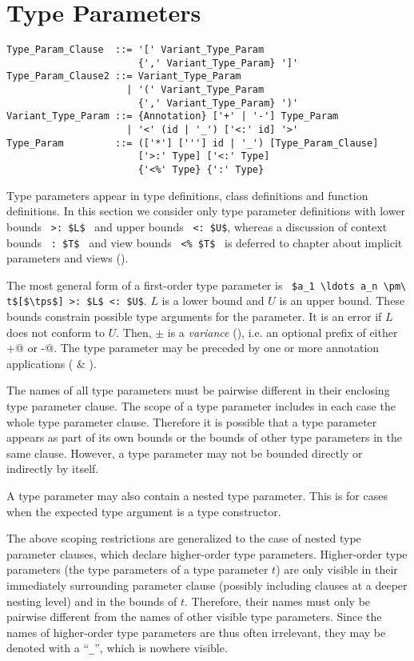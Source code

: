 \section{Type Parameters}

\syntax\begin{lstlisting}
Type_Param_Clause  ::= '[' Variant_Type_Param 
                       {',' Variant_Type_Param} ']'
Type_Param_Clause2 ::= Variant_Type_Param
                     | '(' Variant_Type_Param 
                       {',' Variant_Type_Param} ')'
Variant_Type_Param ::= {Annotation} ['+' | '-'] Type_Param
                     | '<' (id | '_') ['<:' id] '>'
Type_Param         ::= (['*'] ['''] id | '_') [Type_Param_Clause]
                       ['>:' Type] ['<:' Type]
                       {'<%' Type} {':' Type}
\end{lstlisting}

Type parameters appear in type definitions, class definitions and function definitions. In this section we consider only type parameter definitions with lower bounds ~\lstinline!>: $L$!~ and upper bounds ~\lstinline!<: $U$!, whereas a discussion of context bounds ~\lstinline!: $T$!~ and view bounds ~\lstinline!<% $T$!~ is deferred to chapter about implicit parameters and views ().

The most general form of a first-order type parameter is ~\lstinline!$a_1 \ldots a_n \pm\ t$[$\tps$] >: $L$ <: $U$!. $L$ is a lower bound and $U$ is an upper bound. These bounds constrain possible type arguments for the parameter. It is an error if $L$ does not conform to $U$. Then, $\pm$ is a {\em variance} (), i.e. an optional prefix of either \lstinline@+@ or \lstinline@-@. The type parameter may be preceded by one or more annotation applications ( \& ).

The names of all type parameters must be pairwise different in their enclosing type parameter clause. The scope of a type parameter includes in each case the whole type parameter clause. Therefore it is possible that a type parameter appears as part of its own bounds or the bounds of other type parameters in the same clause. However, a type parameter may not be bounded directly or indirectly by itself. 

A type parameter may also contain a nested type parameter. This is for cases when the expected type argument is a type constructor. 

The above scoping restrictions are generalized to the case of nested type parameter clauses, which declare higher-order type parameters. Higher-order type parameters (the type parameters of a type parameter $t$) are only visible in their immediately surrounding parameter clause (possibly including clauses at a deeper nesting level) and in the bounds of $t$. Therefore, their names must only be pairwise different from the names of other visible type parameters. Since the names of higher-order type parameters are thus often irrelevant, they may be denoted with a ``\lstinline!_!'', which is nowhere visible. 

